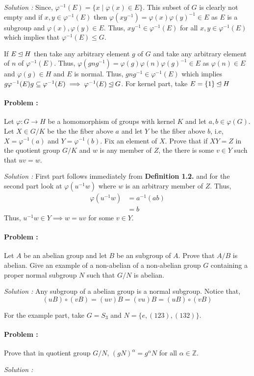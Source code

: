 \vspace{4mm}
\textit{Solution :} Since, $\varphi^{-1}(E) = \{x \mid \varphi(x) \in E\}$. This subset of $G$ is clearly not empty and
if $x,y \in \varphi^{-1}(E)$ then $\varphi(xy^{-1})=\varphi(x) \varphi(y)^{-1} \in E$ as $E$ is a subgroup and 
$\varphi(x), \varphi(y) \in E$. Thus, $xy^{-1} \in \varphi^{-1}(E)$ for all $x,y \in \varphi^{-1}(E)$ which implies that 
$\varphi^{-1}(E) \le G$.

If $E \unlhd H$ then take any arbitrary element $g$ of $G$ and take any arbitrary element of $n$ of $\varphi^{-1}(E)$.
Thus, $\varphi(gng^{-1}) = \varphi(g)\varphi(n) \varphi(g)^{-1} \in E$ as $\varphi(n) \in E$ and $\varphi(g) \in H$ and $E$ is normal.
Thus, $gng^{-1} \in \varphi^{-1}(E)$ which implies $g\varphi^{-1}(E)g \subseteq \varphi^{-1}(E) \implies \varphi^{-1}(E) \unlhd G$.
For kernel part, take $E = \{1\} \unlhd H$

\paragraph{Problem :} Let $\varphi : G \to H$ be a homomorphism of groups with kernel $K$ and let $a,b \in \varphi(G)$. Let $X \in G/K$ be
the the fiber above $a$ and let $Y$ be the fiber above $b$, i.e, $X = \varphi^{-1}(a)$ and $Y = \varphi^{-1}(b)$. Fix an element of $X$.
Prove that if $XY=Z$ in the quotient group $G/K$ and $w$ is any member of $Z$, the there is some $v \in Y$ such that $uv=w$.

\vspace{4mm}
\textit{Solution :} First part follows immediately from \textbf{Definition 1.2.} and for the second part look at $\varphi(u^{-1}w)$ where 
$w$ is an arbitrary member of $Z$. Thus,
\begin{align*}
    \varphi(u^{-1}w) &= a^{-1} (ab) \\
    &= b 
\end{align*}
Thus, $u^{-1}w \in Y \implies w = uv$ for some $v \in Y$.

\paragraph{Problem :} Let $A$ be an abelian group and let $B$ be an subgroup of $A$. Prove that $A/B$ is abelian.
Give an example of a non-abelian of a non-abelian group $G$ containing a proper normal subgroup $N$ such that $G/N$ is abelian. 

\vspace{4mm}
\textit{Solution :} Any subgroup of a abelian group is a normal subgroup. Notice that, 
\[ (uB) \circ (vB) = (uv)B = (vu)B = (uB) \circ (vB) \]

For the example part, take $G= S_3$ and $N = \{e,(123),(132)\}$.

\paragraph{Problem :} Prove that in quotient group $G/N$, $(gN)^{\alpha} = g^{\alpha} N$ for all $\alpha \in \mathbb{Z}$.

\vspace{4mm}
\textit{Solution :} 